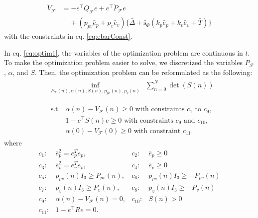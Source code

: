 \documentclass[letterpaper, 10 pt, conference]{ieeeconf}  %
\begin{document}
\begin{align}
\dot{V}_\mathcal{F} &= -e^\top Q_\mathcal{F} e + e^\top \dot{P}_\mathcal{F}e \label{eq:vdot} \\
 &\;\;\;\;+(p_{pv}\bar{e}_p+p_v\bar{e}_v)\{\bar{\Delta} + \bar{\text{s}}_\Phi(k_p\bar{e}_p+k_v\bar{e}_v + \bar{T})\} \nonumber 
\end{align}
with the constraints in eq. \eqref{eq:ebarConst}.

In eq. \eqref{eq:optim1}, the variables of the optimization problem are continuous in $t$. 
To make the optimization problem easier to solve, 
we discretized the variables $P_\mathcal{F}$, $\alpha$, and $S$. 
Then, the optimization problem can be reformulated as the following:
\begin{align}
&
\begin{array}{rl}
\displaystyle{\inf_{P_\mathcal{F}(n),\alpha(n),S(n),p_{pv}(n),p_v(n)}} & \displaystyle{\sum_{n=0}^{N}} \det(S(n))  \\
\end{array} \label{eq:optim2} \\
&
\begin{array}{rl}
\displaystyle{\text{s.t.}}& \dot{\alpha}(n) - \dot{V}_\mathcal{F}(n) \geq 0\text{ with constraints $c_1$ to $c_9$},  \\
& 1-e^\top S(n) e \geq 0\text{ with constraints $c_9$ and $c_{10}$}, \nonumber \\
& \alpha(0) - V_\mathcal{F}(0) \geq 0\text{ with constraint $c_{11}$}. \nonumber
\end{array} \nonumber 
\end{align}
where
\begin{equation}
\begin{array}{rlrl}
c_1:& \bar{e}_p^2 = e_p^Te_p,           & c_2:&\bar{e}_p \geq 0 \\
c_3:& \bar{e}_v^2 = e_v^Te_v,           & c_4:&\bar{e}_v \geq 0 \\
c_5:& p_{pv}(n)I_3 \geq P_{pv}(n),      & c_6:&p_{pv}(n)I_3 \geq -P_{pv}(n) \\
c_7:& p_{ v}(n)I_3 \geq P_{ v}(n),      & c_8:&p_{ v}(n)I_3 \geq -P_{ v}(n) \\
c_9:& \alpha(n) - V_\mathcal{F}(n) = 0, & c_{10}:&S(n) > 0 \\
c_{11}:& 1-e^\top R e = 0. &&
\end{array} \nonumber
\end{equation}
\end{document}
